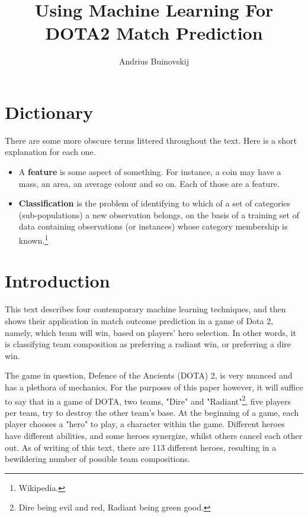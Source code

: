 \documentclass[a4paper, 12pt]{article}
\begin{document}
\title{Using Machine Learning For DOTA2 Match Prediction}
\author{Andrius Buinovskij}
\maketitle

    \section{Dictionary}

	\par There are some more obscure terms littered throughout the text. Here is a short explanation for each one.

        \begin{itemize}
            \item A \textbf{feature} is some aspect of something. For instance, a coin may have a mass, an area, an average colour and so on. Each of those are a feature.
            \item \textbf{Classification} is the problem of identifying to which of a set of categories (sub-populations) a new observation belongs, on the basis of a training set of data containing observations (or instances) whose category membership is known.\footnote{Wikipedia.}

        \end{itemize}

    \section{Introduction}

        \par This text describes four contemporary machine learning techniques, and then shows their application in match outcome prediction in a game of Dota 2, namely, which team will win, based on players' hero selection. In other words, it is classifying team composition as preferring a radiant win, or preferring a dire win.

        \par The game in question, Defence of the Ancients (DOTA) 2, is very nuanced and has a plethora of mechanics. For the purposes of this paper however, it will suffice to say that in a game of DOTA, two teams, "Dire" and "Radiant"\footnote{Dire being evil and red, Radiant being green good.}, five players per team, try to destroy the other team's base. At the beginning of a game, each player chooses a "hero" to play, a character within the game. Different heroes have different abilities, and some heroes synergize, whilst others cancel each other out. As of writing of this text, there are 113 different heroes, resulting in a bewildering number of possible team compositions.
        
\end{document}
